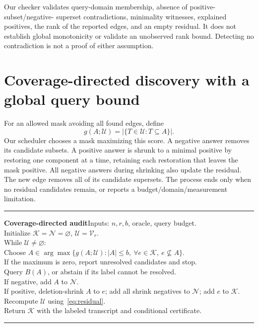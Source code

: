 \documentclass[10pt]{article}
\theoremstyle{definition}\newtheorem{definition}[theorem]{Definition}
\newcommand{\KK}{\mathcal K}
\newcommand{\NN}{\mathcal N}
\newcommand{\UU}{\mathcal U}
\newcommand{\VV}{\mathcal V}
\begin{document}
Our checker validates query-domain membership, absence of positive-subset/negative-
superset contradictions, minimality witnesses, explained positives, the rank of the
reported edges, and an empty residual. It does not establish global monotonicity or
validate an unobserved rank bound. Detecting no contradiction is not a proof of
either assumption.

\section{Coverage-directed discovery with a global query bound}
For an allowed mask avoiding all found edges, define
\begin{equation}
 g(A;\UU)=|\{T\in\UU:T\subseteq A\}|.
\end{equation}
Our scheduler chooses a mask maximizing this score. A negative answer removes its
candidate subsets. A positive answer is shrunk to a minimal positive by restoring
one component at a time, retaining each restoration that leaves the mask positive.
All negative answers during shrinking also update the residual. The new edge removes
all of its candidate supersets. The process ends only when no residual candidates
remain, or reports a budget/domain/measurement limitation.

\begin{center}
\begin{minipage}{0.94\linewidth}
\hrule\vspace{5pt}
\textbf{Coverage-directed audit}\quad Inputs: $n,r,b$, oracle, query budget.\\
Initialize $\KK=\NN=\varnothing$, $\UU=\VV_r$.\\
While $\UU\ne\varnothing$:\\
\hspace*{1em}Choose $A\in\arg\max\{g(A;\UU):|A|\le b,\ \forall e\in\KK,\ e\nsubseteq A\}$.\\
\hspace*{1em}If the maximum is zero, report unresolved candidates and stop.\\
\hspace*{1em}Query $B(A)$, or abstain if its label cannot be resolved.\\
\hspace*{1em}If negative, add $A$ to $\NN$.\\
\hspace*{1em}If positive, deletion-shrink $A$ to $e$; add all shrink negatives to $\NN$; add $e$ to $\KK$.\\
\hspace*{1em}Recompute $\UU$ using~\eqref{eq:residual}.\\
Return $\KK$ with the labeled transcript and conditional certificate.\vspace{5pt}\hrule
\end{minipage}
\end{center}
\end{document}
